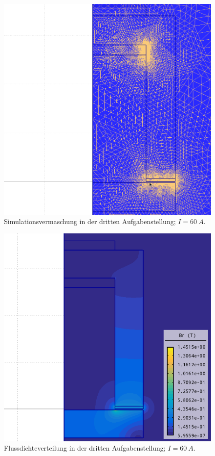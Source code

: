 \documentclass[conference,a4paper,twoside]{IEEEtran}
\begin{document}
\begin{figure}
\centerline{\includegraphics[width=0.7\columnwidth]{../assets/assignment_3_mesh.png}}
\caption{Simulationsvermaschung in der dritten Aufgabenstellung; $I = 60\ A$.}
\label{assignment_3_mesh}
\end{figure}

\begin{figure}
\centerline{\includegraphics[width=0.7\columnwidth]{../assets/assignment_3_simulation.png}}
\caption{Flussdichteverteilung in der dritten Aufgabenstellung; $I = 60\ A$.}
\label{assignment_3_simulation}
\end{figure}
\end{document}
